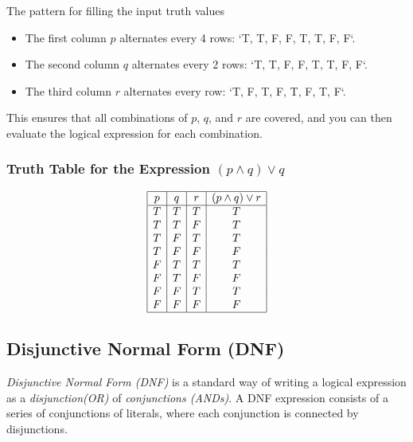 The pattern for filling the input truth values

\begin{itemize}

	\item The first column \(p\) alternates every 4 rows: `T, T, F, F, T, T, F, F`.

	\item The second column \(q\) alternates every 2 rows: `T, T, F, F, T, T, F, F`.

	\item The third column \(r\) alternates every row: `T, F, T, F, T, F, T, F`.

\end{itemize}

This ensures that all combinations of \(p\), \(q\), and \(r\) are covered, and you
can then evaluate the logical expression for each combination.

\subsubsection{Truth Table for the Expression \texorpdfstring{\( (p \land q) \lor q \)}{}}

\[
	\begin{array}{|c|c|c|c|}
		\hline
		p & q & r & (p \land q) \lor r \\
		\hline
		T & T & T & T                  \\
		T & T & F & T                  \\
		T & F & T & T                  \\
		T & F & F & F                  \\
		F & T & T & T                  \\
		F & T & F & F                  \\
		F & F & T & T                  \\
		F & F & F & F                  \\
		\hline
	\end{array}
\]

\subsection{Disjunctive Normal Form (DNF)}

\emph{Disjunctive Normal Form (DNF)} is a standard way of writing a logical expression as a
\emph{disjunction(OR)} of \emph{conjunctions (ANDs)}. A DNF expression consists of a series of
conjunctions of literals, where each conjunction is connected by disjunctions.

